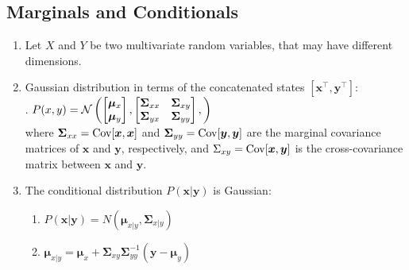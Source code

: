 \subsection{Marginals and Conditionals}

\begin{enumerate}
    \item Let $X$ and $Y$ be two multivariate random variables, that may have different dimensions.
    \hfill \cite{mfml/book/mml/Deisenroth-Faisal-Ong}

    \item Gaussian distribution in terms of the concatenated states $[\bm{x}^\top, \bm{y}^\top]$:
    \hfill \cite{mfml/book/mml/Deisenroth-Faisal-Ong}
    \\[0.2cm]
    .\hfill
    $
        P(x, y)
        = \mathcal{N}\left(
            \begin{bmatrix}
                \bm{\mu}_x \\ \bm{\mu}_y
            \end{bmatrix},
            \begin{bmatrix}
                \bm{\Sigma}_{xx} & \bm{\Sigma}_{xy} \\ 
                \bm{\Sigma}_{yx} & \bm{\Sigma}_{yy} \\ 
            \end{bmatrix},
        \right)
    $
    \hfill \cite{mfml/book/mml/Deisenroth-Faisal-Ong}
    \\[0.2cm]
    where $\bm{\Sigma}_{xx} = \text{Cov}[\bm{x}, \bm{x}]$ and $\bm{\Sigma}_{yy} = \text{Cov}[\bm{y}, \bm{y}]$ are the marginal covariance matrices of $\bm{x}$ and $\bm{y}$, respectively, and $\Sigma_{xy} = \text{Cov}[\bm{x}, \bm{y}]$ is the cross-covariance matrix between $\bm{x}$ and $\bm{y}$.
    \hfill \cite{mfml/book/mml/Deisenroth-Faisal-Ong}

    \item The conditional distribution $P(\bm{x} | \bm{y})$ is Gaussian:
    \hfill \cite{mfml/book/mml/Deisenroth-Faisal-Ong}
    \begin{multicols}{2}
    \begin{enumerate}
        \item $ P(\bm{x} | \bm{y}) = N (\bm{\mu}_{x | y} , \bm{\Sigma}_{x | y}) $
        \hfill \cite{mfml/book/mml/Deisenroth-Faisal-Ong}

        \item $ \bm{\mu}_{x | y} = \bm{\mu}_x + \bm{\Sigma}_{xy} \bm{\Sigma}^{-1} _{yy} (\bm{y} - \bm{\mu}_y )  $
        \hfill \cite{mfml/book/mml/Deisenroth-Faisal-Ong}


\end{enumerate}
\end{multicols}
\end{enumerate}
